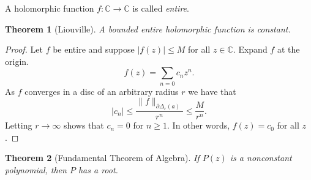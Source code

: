 \documentclass[12pt,openany]{book}
\newcommand{\sabs}[1]{\lvert {#1} \rvert}
\newcommand{\snorm}[1]{\lVert {#1} \rVert}
\newcommand{\C}{{\mathbb{C}}}
\theoremstyle{plain}
\newtheorem{thm}{Theorem}[section]
\theoremstyle{remark}
\theoremstyle{definition}
\theoremstyle{exercise}
\theoremstyle{example}
\begin{document}
A holomorphic function $f \colon \C \to \C$ is called
\emph{entire}.

\begin{thm}[Liouville]
A bounded entire holomorphic function is constant.
\end{thm}

\begin{proof}
Let $f$ be entire and suppose $\sabs{f(z)} \leq M$ for all $z \in \C$.
Expand $f$ at the origin.
\begin{equation*}
f(z) = \sum_{n=0} c_n z^n .
\end{equation*}
As $f$ converges in a disc of an arbitrary radius $r$ we have that
\begin{equation*}
\sabs{c_n} \leq \frac{\snorm{f}_{\partial \Delta_r(a)}}{r^n} \leq
\frac{M}{r^n} .
\end{equation*}
Letting $r \to \infty$ shows that $c_n = 0$ for $n \geq 1$.  In other
words, $f(z) = c_0$ for all $z$.
\end{proof}

\begin{thm}[Fundamental Theorem of Algebra]
If $P(z)$ is a nonconstant polynomial, then $P$ has a root.
\end{thm}
\end{document}
